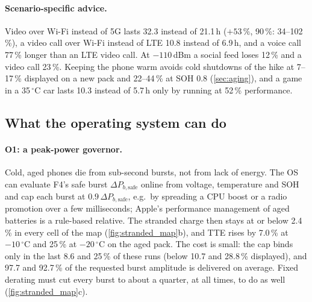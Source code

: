 \paragraph{Scenario-specific advice.} Video over Wi-Fi instead of 5G lasts 32.3 instead of 21.1\,h ($+53\,\%$,
90\,\%: 34--102\,\%), a video call over Wi-Fi instead of LTE 10.8 instead of 6.9\,h, and a voice call 77\,\% longer
than an LTE video call. At $-110$\,dBm a social feed loses 12\,\% and a video call 23\,\%. Keeping the phone warm avoids cold shutdowns of the
hike at 7--17\,\% displayed on a new pack and 22--44\,\% at SOH 0.8 (\cref{sec:aging}), and a game in a
35\,$^\circ$C car lasts 10.3 instead of 5.7\,h only by running at 52\,\% performance.

\subsection{What the operating system can do}
\paragraph{O1: a peak-power governor.} Cold, aged phones die from sub-second bursts, not from lack of energy. The
OS can evaluate F4's safe burst $\Delta P_{b,\mathrm{safe}}$ online from voltage, temperature and SOH and cap each
burst at $0.9\,\Delta P_{b,\mathrm{safe}}$, e.g.\ by spreading a CPU boost or a radio promotion over a few
milliseconds; Apple's performance management of aged batteries \cite{AP-BATT} is a rule-based relative. The
stranded charge then stays at or below 2.4\,\% in every cell of the map (\cref{fig:stranded_map}b), and TTE rises
by 7.0\,\% at $-10\,^\circ$C and 25\,\% at $-20\,^\circ$C on the aged pack. The cost is small: the cap binds only in
the last 8.6 and 25\,\% of these runs (below 10.7 and 28.8\,\% displayed), and 97.7 and 92.7\,\% of the requested
burst amplitude is delivered on average. Fixed derating must cut every burst to about a quarter, at all times, to
do as well (\cref{fig:stranded_map}c).

